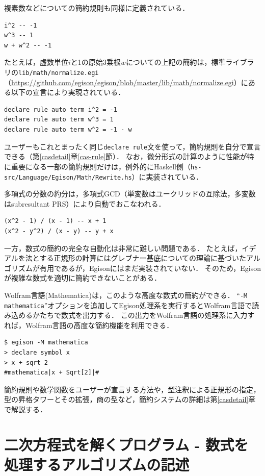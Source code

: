 複素数などについての簡約規則も同様に定義されている．
\begin{lstlisting}[language=egison,numbers=none]
i^2 -- -1
w^3 -- 1
w + w^2 -- -1
\end{lstlisting}
たとえば，虚数単位$i$と1の原始3乗根$w$についての上記の簡約は，標準ライブラリの\texttt{lib/math/normalize.egi}（\url{https://github.com/egison/egison/blob/master/lib/math/normalize.egi}）にある以下の宣言により実現されている．
\begin{lstlisting}[language=egison,numbers=none]
declare rule auto term i^2 = -1
declare rule auto term w^3 = 1
declare rule auto term w^2 = -1 - w
\end{lstlisting}
ユーザーもこれとまったく同じ\lstinline{declare rule}文を使って，簡約規則を自分で宣言できる（第\ref{casdetail}章\ref{cas-rule}節）．
なお，微分形式の計算のように性能が特に重要になる一部の簡約規則だけは，例外的にHaskell側（\texttt{hs-src/Language/Egison/Math/Rewrite.hs}）に実装されている．

多項式の分数の約分は，多項式GCD（単変数はユークリッドの互除法，多変数はsubresultant PRS）により自動でおこなわれる．
\begin{lstlisting}[language=egison,numbers=none]
(x^2 - 1) / (x - 1) -- x + 1
(x^2 - y^2) / (x - y) -- y + x
\end{lstlisting}
一方，数式の簡約の完全な自動化は非常に難しい問題である．
たとえば，イデアルを法とする正規形の計算にはグレブナー基底についての理論に基づいたアルゴリズムが有用であるが，Egisonにはまだ実装されていない．
そのため，Egisonが複雑な数式を適切に簡約できないことがある．

Wolfram言語(Mathematica)は，このような高度な数式の簡約ができる．
``\texttt{-M mathematica}''オプションを追加してEgison処理系を実行するとWolfram言語で読み込めるかたちで数式を出力する．
この出力をWolfram言語の処理系に入力すれば，Wolfram言語の高度な簡約機能を利用できる．
\begin{lstlisting}[language=egison,numbers=none]
$ egison -M mathematica
> declare symbol x
> x + sqrt 2
#mathematica|x + Sqrt[2]|#
\end{lstlisting}

簡約規則や数学関数をユーザーが宣言する方法や，型注釈による正規形の指定，型の昇格タワーとその拡張，商の型など，簡約システムの詳細は第\ref{casdetail}章で解説する．

\section{二次方程式を解くプログラム - 数式を処理するアルゴリズムの記述}\label{cas-quadratic}

